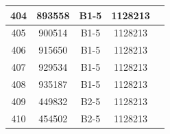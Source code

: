 \documentclass[UTF8,10pt,a4paper,fontset=fandol]{ctexart}
\newcommand{\fieldvalue}[1]{#1}
\begin{document}
\begin{center}
\begin{tabular}{|c|c|c|c|c|}
\fieldvalue{404} &
\fieldvalue{893558} &
\fieldvalue{B1-5} &
\fieldvalue{1128213} & \\ \hline

\fieldvalue{405} &
\fieldvalue{900514} &
\fieldvalue{B1-5} &
\fieldvalue{1128213} & \\ \hline

\fieldvalue{406} &
\fieldvalue{915650} &
\fieldvalue{B1-5} &
\fieldvalue{1128213} & \\ \hline

\fieldvalue{407} &
\fieldvalue{929534} &
\fieldvalue{B1-5} &
\fieldvalue{1128213} & \\ \hline

\fieldvalue{408} &
\fieldvalue{935187} &
\fieldvalue{B1-5} &
\fieldvalue{1128213} & \\ \hline

\fieldvalue{409} &
\fieldvalue{449832} &
\fieldvalue{B2-5} &
\fieldvalue{1128213} & \\ \hline

\fieldvalue{410} &
\fieldvalue{454502} &
\fieldvalue{B2-5} &
\fieldvalue{1128213} & \\ \hline


\end{tabular}
\end{center}
\end{document}
